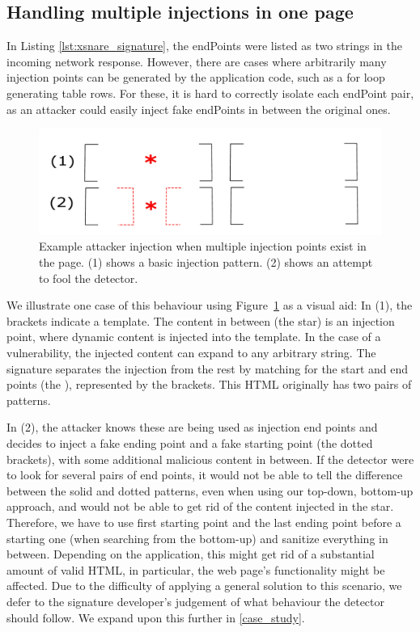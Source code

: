 \subsection{Handling multiple injections in one page} \label{multiple_injections}
In Listing \ref{lst:xsnare_signature}, the endPoints were listed as two strings in the incoming network response. However, there are cases where arbitrarily many injection points can be generated by the application code, such as a for loop generating table rows. For these, it is hard to correctly isolate each endPoint pair, as an attacker could easily inject fake endPoints in between the original ones.

\begin{figure}[h]
	\includegraphics[scale=0.25]{img/attacker_injection_compound.pdf}
	\caption{Example attacker injection when multiple injection points exist in the page. (1) shows a basic injection pattern. (2) shows an attempt to fool the detector.}
	\label{fig:attacker_injection}
\end{figure}

We illustrate one case of this behaviour using Figure~\ref{fig:attacker_injection} as a visual aid: In (1), the brackets indicate a template. The content in between (the star) is an injection point, where dynamic content is injected into the template. In the case of a vulnerability, the injected content can expand to any arbitrary string. The signature separates the injection from the rest by matching for the start and end points (the ), represented by the brackets. This HTML originally has two pairs of  patterns.

In (2), the attacker knows these are being used as injection end points and decides to inject a fake ending point and a fake starting point (the dotted brackets), with some additional malicious content in between. If the detector were to look for several pairs of end points, it would not be able to tell the difference between the solid and dotted patterns, even when using our top-down, bottom-up approach, and would not be able to get rid of the content injected in the star. Therefore, we have to use first starting point and the last ending point before a starting one (when searching from the bottom-up) and sanitize everything in between. Depending on the application, this might get rid of a substantial amount of valid HTML, in particular, the web page's functionality might be affected. Due to the difficulty of applying a general solution to this scenario, we defer to the signature developer's judgement of what behaviour the detector should follow. We expand upon this further in \autoref{case_study}.


